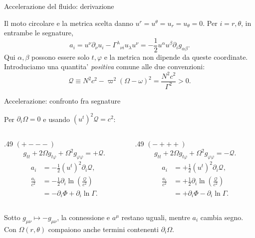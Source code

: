 \begin{frame}[t]{Accelerazione del fluido: derivazione}
\small\raggedright
Il moto circolare e la metrica scelta danno $u^r=u^\theta=u_r=u_\theta=0$.
Per $i=r,\theta$, in entrambe le segnature,
\[
a_i=u^\nu\partial_\nu u_i
-\Gamma^\lambda{}_{\nu i}u_\lambda u^\nu
=-\frac12u^\alpha u^\beta\partial_i g_{\alpha\beta}.
\]
Qui $\alpha,\beta$ possono essere solo $t,\varphi$ e la metrica non dipende da queste coordinate.
Introduciamo una quantita' \emph{positiva} comune alle due convenzioni:
\[
\mathcal Q\equiv N^2c^2-\varpi^2(\Omega-\omega)^2
=\frac{N^2c^2}{\Gamma^2}>0.
\]
\end{frame}


\begin{frame}[t]{Accelerazione: confronto fra segnature}
\small\raggedright
Per $\partial_i\Omega=0$ e usando $(u^t)^2\mathcal Q=c^2$:
\begin{columns}[T,onlytextwidth]
\begin{column}{.49\textwidth}
\centering\textbf{$(+---)$}
\[
g_{tt}+2\Omega g_{t\varphi}+\Omega^2g_{\varphi\varphi}=+\mathcal Q.
\]
\[
\begin{aligned}
a_i&=-\tfrac12(u^t)^2\partial_i\mathcal Q,\\[.5ex]
\frac{a_i}{c^2}&=-\frac12\partial_i\ln\left(\frac{\mathcal Q}{c^2}\right)\\
&=-\partial_i\Phi+\partial_i\ln\Gamma.
\end{aligned}
\]
\end{column}
\begin{column}{.49\textwidth}
\centering\textbf{$(-+++)$}
\[
g_{tt}+2\Omega g_{t\varphi}+\Omega^2g_{\varphi\varphi}=-\mathcal Q.
\]
\[
\begin{aligned}
a_i&=+\tfrac12(u^t)^2\partial_i\mathcal Q,\\[.5ex]
\frac{a_i}{c^2}&=+\frac12\partial_i\ln\left(\frac{\mathcal Q}{c^2}\right)\\
&=+\partial_i\Phi-\partial_i\ln\Gamma.
\end{aligned}
\]
\end{column}
\end{columns}
\par\smallskip
Sotto $g_{\mu\nu}\mapsto-g_{\mu\nu}$, la connessione e $a^\mu$ restano uguali,
mentre $a_i$ cambia segno.
Con $\Omega(r,\theta)$ compaiono anche termini contenenti $\partial_i\Omega$.
\end{frame}


